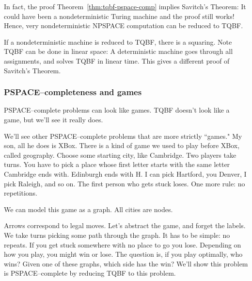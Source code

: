 \vskip0.15in
In fact, the proof Theorem~\ref{thm:tqbf-pspace-comp} implies Savitch's Theorem: It could have been a nondeterministic Turing machine and the proof still works! Hence, very nondeterministic NPSPACE computation can be reduced to TQBF.

If a nondeterministic machine is reduced to TQBF, there is a squaring. Note TQBF can be done in linear space: A deterministic machine goes through all assignments, and solves TQBF in linear time. This gives a different proof of Savitch's Theorem.

\subsubsection{PSPACE--completeness and games}

PSPACE--complete problems can look like games. TQBF doesn't look like a game, but we'll see it really does. 

We'll see other PSPACE--complete problems that are more strictly ``games." My son, all he does is XBox. There is a kind of game we used to play before XBox, called geography. Choose some starting city, like Cambridge. Two players take turns. You have to pick a place whose first letter starts with the same letter Cambridge ends with. Edinburgh ends with H. I can pick Hartford, you Denver, I pick Raleigh, and so on. The first person who gets stuck loses. One more rule: no repetitions. %

We can model this game as a graph. All cities are nodes.


 Arrows correspond to legal moves. Let's abstract the game, and forget the labels. We take turns picking some path through the graph. It has to be simple: no repeats. 
If you get stuck somewhere with no place to go you lose. Depending on how you play, you might win or lose. The question is, if you play optimally, who wins? Given one of these graphs, which side has the win? We'll show this problem is PSPACE--complete by reducing TQBF to this problem.

